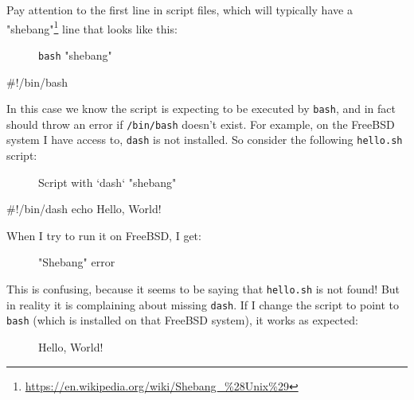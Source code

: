 \documentclass[10pt,american,]{book}
\newenvironment{Shaded}{\begin{snugshade}}{\end{snugshade}}
\newcommand{\KeywordTok}[1]{\textcolor[rgb]{0.13,0.29,0.53}{\textbf{{#1}}}}
\newcommand{\CommentTok}[1]{\textcolor[rgb]{0.56,0.35,0.01}{\textit{{#1}}}}
\newcommand{\NormalTok}[1]{{#1}}
\renewcommand{\href}[2]{#2\footnote{\url{#1}}}
\numberwithin{figure}{chapter}
\DeclareRobustCommand{\drcap}[1]{\begin{figure}[H]\caption{#1}\end{figure}}
\renewcommand{\KeywordTok}[1]{{#1}}
\renewcommand{\CommentTok}[1]{{#1}}
\renewcommand{\NormalTok}[1]{{#1}}
\begin{document}
Pay attention to the first line in script files, which will typically
have a
\href{https://en.wikipedia.org/wiki/Shebang_\%28Unix\%29}{"shebang"}
 line that looks like this:

\drcap{\texttt{bash} "shebang"}

\begin{Shaded}
\begin{Highlighting}[]
\CommentTok{#!/bin/bash}
\end{Highlighting}
\end{Shaded}

In this case we know the script is expecting to be executed by
\texttt{bash}, and in fact should throw an error if \texttt{/bin/bash}
doesn't exist. For example, on the FreeBSD system I have access to,
\texttt{dash} is not installed. So consider the following
\texttt{hello.sh} script:

\drcap{Script with `dash` "shebang"}

\begin{Shaded}
\begin{Highlighting}[]
\CommentTok{#!/bin/dash}
\KeywordTok{echo} \NormalTok{Hello, World!}
\end{Highlighting}
\end{Shaded}

When I try to run it on FreeBSD, I get:

\drcap{"Shebang" error}

\begin{Shaded}
\end{Shaded}

This is confusing, because it seems to be saying that \texttt{hello.sh}
is not found! But in reality it is complaining about missing
\texttt{dash}. If I change the script to point to \texttt{bash} (which
is installed on that FreeBSD system), it works as expected:

\drcap{Hello, World!}

\begin{Shaded}
\end{Shaded}
\end{document}
